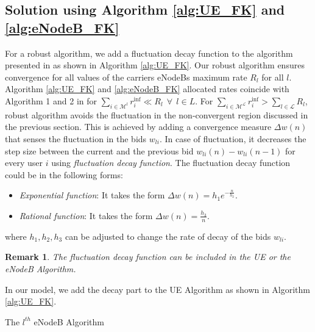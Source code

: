 \documentclass[journal]{IEEEtran} 		\usepackage{amsmath,amssymb}
\newtheorem{rem}[thm]{Remark}
\begin{document}
\subsection{Solution using Algorithm \ref{alg:UE_FK} and \ref{alg:eNodeB_FK}}\label{sec:conv_solution}
For a robust algorithm, we add a fluctuation decay function to the algorithm presented in \cite{Ahmed_Utility4} as shown in Algorithm \ref{alg:UE_FK}. Our robust algorithm ensures convergence for all values of the carriers eNodeBs maximum rate $R_l$ for all $l$. Algorithm \ref{alg:UE_FK} and \ref{alg:eNodeB_FK} allocated rates coincide with Algorithm 1 and 2 in \cite{Ahmed_Utility4} for $\sum_{i \in \mathcal{M}^{l}}r_i^{\text{inf}} \ll R_l \:\: \forall \:\: l \in L$. For $\sum_{i \in \mathcal{M}^{\mathcal{L}}}r_i^{\text{inf}}> \sum_{l \in \mathcal{L}}R_l$, robust algorithm avoids the fluctuation in the non-convergent region discussed in the previous section. This is achieved by adding a convergence measure $\Delta w(n)$ that senses the fluctuation in the bids $w_{li}$. In case of fluctuation, it decreases the step size between the current and the previous bid $w_{li}(n) -w_{li}(n-1)$ for every user $i$ using \textit{fluctuation decay function}. The
fluctuation decay function could be in the following forms:
\begin{itemize}
\item \textit{Exponential function}: It takes the form $\Delta w(n) = h_1 e^{-\frac{n}{h_2}}$.
\item \textit{Rational function}: It takes the form $\Delta w(n) = \frac{h_3}{n}$.
\end{itemize}
where $h_1, h_2, h_3$ can be adjusted to change the rate of decay of the bids $w_{li}$. 

\begin{rem}
The fluctuation decay function can be included in the UE or the eNodeB Algorithm.
\end{rem}
In our model, we add the decay part to the UE Algorithm as shown in Algorithm \ref{alg:UE_FK}.


\begin{algorithm}[tb]
\caption{The $l^{th}$ eNodeB Algorithm}\label{alg:eNodeB_FK}
\begin{algorithmic}
\LOOP
			 
		\ELSE
\ENDIF
\ENDLOOP
\end{algorithmic}
\end{algorithm}
\end{document}
